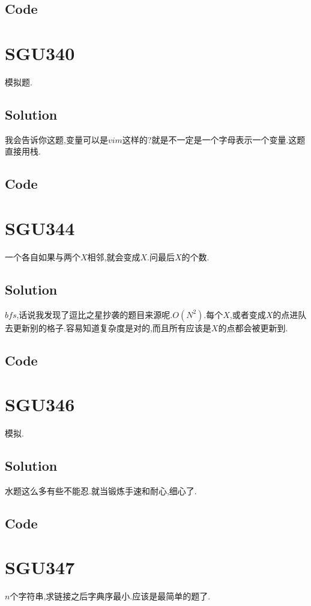 \documentclass{article}
\newcommand{\includecode}[2][c]{}
\begin{document}
\begin{flushleft}
\subsection{Code}
\includecode[C++]{339v1.cc}
\includecode[C++]{339v2.cc}

\section{SGU340}
模拟题.
\subsection{Solution}
我会告诉你这题,变量可以是$vim$这样的?就是不一定是一个字母表示一个变量.这题直接用栈.
\subsection{Code}
\includecode[C++]{340.cc}


\section{SGU344}
一个各自如果与两个$X$相邻,就会变成$X$.问最后$X$的个数.
\subsection{Solution}
$bfs$,话说我发现了逗比之星抄袭的题目来源呢.$O(N^2)$.每个$X$,或者变成$X$的点进队去更新别的格子.容易知道复杂度是对的,而且所有应该是$X$的点都会被更新到.
\subsection{Code}
\includecode[C++]{344.cc}

\section{SGU346}
模拟.
\subsection{Solution}
水题这么多有些不能忍.就当锻炼手速和耐心,细心了.
\subsection{Code}
\includecode[C++]{346.cc}

\section{SGU347}
$n$个字符串,求链接之后字典序最小.应该是最简单的题了.

\end{flushleft}
\end{document}
